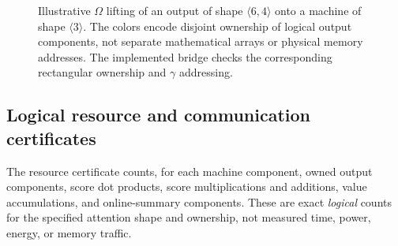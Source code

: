 \documentclass[11pt]{article}
\begin{document}
\begin{figure}[t]
\centering
{}
\caption{Illustrative $\Omega$ lifting of an output of shape
$\langle6,4\rangle$ onto a machine of shape $\langle3\rangle$.
The colors encode disjoint ownership of logical output components,
not separate mathematical arrays or physical memory addresses.
The implemented bridge checks the corresponding rectangular
ownership and $\gamma$ addressing.}
\label{step108:fig:moa-omega-ownership}
\end{figure}

\subsection{Logical resource and communication certificates}
\label{step108:subsec:communication-certificate}

The resource certificate counts, for each machine component, owned output
components, score dot products, score multiplications and additions, value
accumulations, and online-summary components.  These are exact \emph{logical}
counts for the specified attention shape and ownership, not measured time,
power, energy, or memory traffic.
\end{document}
